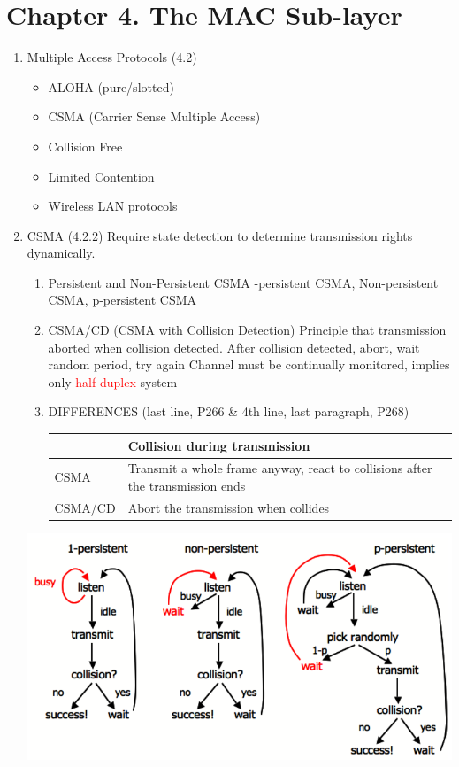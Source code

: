 \documentclass[a4paper,10pt]{article}
\newcommand{\red}[1]{\textcolor{red}{#1}}
\begin{document}
\newpage\section*{Chapter 4. The MAC Sub-layer}
\begin{enumerate}
  \item Multiple Access Protocols (4.2)
    \begin{itemize}
      \item ALOHA (pure/slotted)
      \item CSMA (Carrier Sense Multiple Access)
      \item Collision Free
      \item Limited Contention
      \item Wireless LAN protocols
    \end{itemize}
  
  \item CSMA (4.2.2)
    \newline Require state detection to determine transmission rights dynamically.
    \begin{enumerate}
      \item Persistent and Non-Persistent CSMA
        -persistent CSMA, Non-persistent CSMA, p-persistent CSMA
      \item CSMA/CD (CSMA with Collision Detection)
        \newline Principle that transmission aborted when collision detected.
        \newline After collision detected, abort, wait random period, try again
        \newline Channel must be continually monitored, implies only \red{half-duplex} system
      \item DIFFERENCES (last line, P266 \& 4th line, last paragraph, P268)
        \newline\begin{table}[h]\begin{tabularx}{\textwidth}{l | X}
          & Collision during transmission \\ \hline
          CSMA & Transmit a whole frame anyway, react to collisions after the transmission ends \\ \hline
          CSMA/CD & Abort the transmission when collides
      \end{tabularx}\end{table}
    \end{enumerate}
    \includegraphics[width=\textwidth]{persistent}
  

\end{enumerate}
\end{document}
